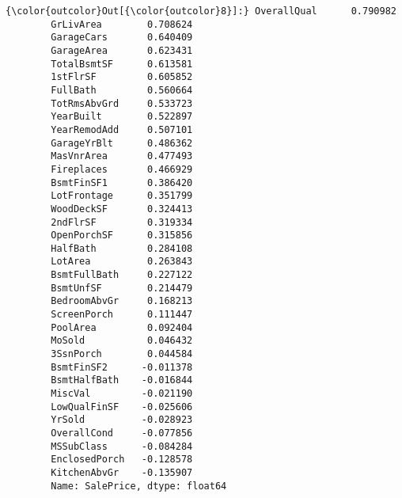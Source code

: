 \documentclass[11pt]{article}
\begin{document}
\begin{Verbatim}[commandchars=\\\{\}]
{\color{outcolor}Out[{\color{outcolor}8}]:} OverallQual      0.790982
        GrLivArea        0.708624
        GarageCars       0.640409
        GarageArea       0.623431
        TotalBsmtSF      0.613581
        1stFlrSF         0.605852
        FullBath         0.560664
        TotRmsAbvGrd     0.533723
        YearBuilt        0.522897
        YearRemodAdd     0.507101
        GarageYrBlt      0.486362
        MasVnrArea       0.477493
        Fireplaces       0.466929
        BsmtFinSF1       0.386420
        LotFrontage      0.351799
        WoodDeckSF       0.324413
        2ndFlrSF         0.319334
        OpenPorchSF      0.315856
        HalfBath         0.284108
        LotArea          0.263843
        BsmtFullBath     0.227122
        BsmtUnfSF        0.214479
        BedroomAbvGr     0.168213
        ScreenPorch      0.111447
        PoolArea         0.092404
        MoSold           0.046432
        3SsnPorch        0.044584
        BsmtFinSF2      -0.011378
        BsmtHalfBath    -0.016844
        MiscVal         -0.021190
        LowQualFinSF    -0.025606
        YrSold          -0.028923
        OverallCond     -0.077856
        MSSubClass      -0.084284
        EnclosedPorch   -0.128578
        KitchenAbvGr    -0.135907
        Name: SalePrice, dtype: float64
\end{Verbatim}
            
\end{document}
